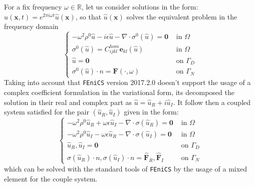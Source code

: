 For a fix frequency $\omega \in \mathbb{R}$, let us consider solutions in the form: $u(\mathbf{x},t) = e^{2 \pi i \omega t}\hat{u}(\mathbf{x})$, so that $\hat{u}(\mathbf{x})$ solves the equivalent problem in the frequency domain
\begin{equation*}
    \left \{
    \begin{array}{cc}
        -\omega^2 \rho^{0} \hat{u} - i \epsilon \hat{u} - \nabla \cdot \sigma^0 (\hat{u}) = \mathbf{0} & \text{ in } \Omega\\
        \sigma^{0}(\hat{u})  =  C_{ijkl}^{hom}\mathbf{e}_{kl}(\hat{u}) & \text{ in } \Omega \\
        \hat{u} = \mathbf{0} & \text{ on } \Gamma_D\\
        \sigma^{0}(\hat{u}) \cdot n = \mathbf{F}(\cdot, \omega) & \text{ on } \Gamma_N
    \end{array}
    \right .
\end{equation*}
Taking into account that \texttt{FEniCS} version 2017.2.0 doesn't support the usage of a complex coefficient formulation in the variational form, its decomposed the solution in their real and complex part as $\hat{u} = \hat{u}_R + i \hat{u}_I$. It follow then a coupled system satisfied for the pair $(\hat{u}_R, \hat{u}_I)$ given in the form:
\begin{equation*}
    \left \{
    \begin{array}{cc}
        -\omega^2 \rho^0 \hat{u}_R +  \omega \epsilon \hat{u}_I - \nabla \cdot \sigma (\hat{u}_R) = \mathbf{0} & \text{ in } \Omega \\
        -\omega^2 \rho^0 \hat{u}_I - \omega \epsilon \hat{u}_R - \nabla \cdot \sigma (\hat{u}_I) = \mathbf{0} & \text{ in } \Omega \\
        \hat{u}_R, \hat{u}_I = \mathbf{0} & \text{ on } \Gamma_D \\
        \sigma(\hat{u}_R)\cdot n, \sigma(\hat{u}_I)\cdot n = \hat{\mathbf{F}}_R, \hat{\mathbf{F}}_I & \text{ on }\Gamma_N
    \end{array}
    \right.
\end{equation*}
which can be solved with the standard tools of \texttt{FEniCS} by the usage of a mixed element for the couple system.

